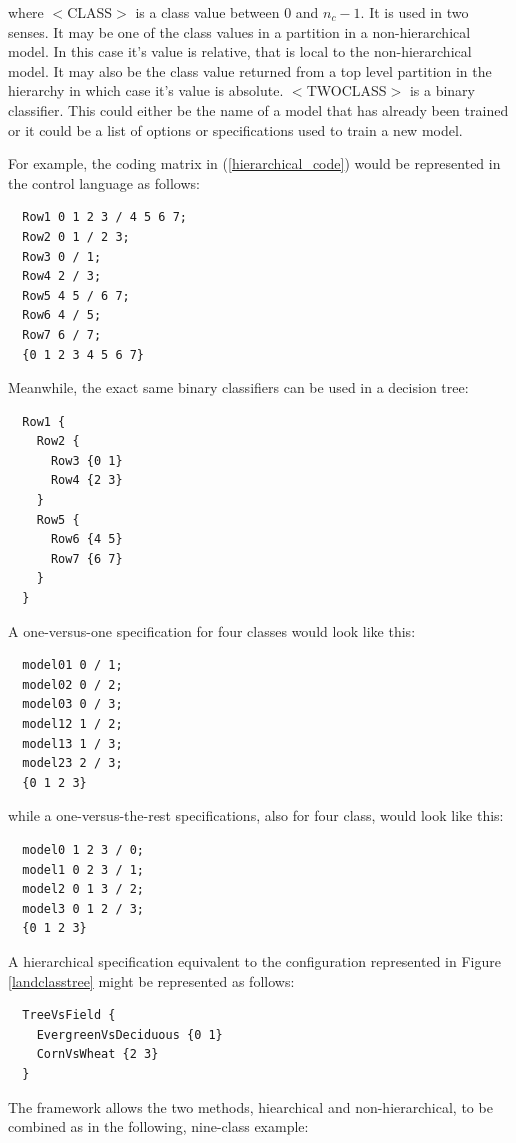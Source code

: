 where $<$CLASS$>$ is a class value between 0 and $n_c-1$.  It is used in two senses.
It may be one of the class values in a partition in a non-hierarchical model.
In this case it's value is relative, that is local to the non-hierarchical model.
It may also be the class value returned
from a top level partition in the hierarchy in which case it's value is absolute.
$<$TWOCLASS$>$ is a binary classifier.
This could either be the name of a model that has already been trained or it
could be a list of options or specifications used to train a new model.

For example, the coding matrix in (\ref{hierarchical_code})
would be represented in the control language as follows:

\begin{verbatim}
  Row1 0 1 2 3 / 4 5 6 7;
  Row2 0 1 / 2 3;
  Row3 0 / 1;
  Row4 2 / 3;
  Row5 4 5 / 6 7;
  Row6 4 / 5;
  Row7 6 / 7;
  {0 1 2 3 4 5 6 7}
\end{verbatim}

Meanwhile, the exact same binary classifiers can be used in
a decision tree: 

\begin{verbatim}
  Row1 {
    Row2 {
      Row3 {0 1}
      Row4 {2 3}
    }
    Row5 {
      Row6 {4 5}
      Row7 {6 7}
    }
  }
\end{verbatim}

A one-versus-one specification for four classes would look like
this:

\begin{verbatim}
  model01 0 / 1;
  model02 0 / 2;
  model03 0 / 3;
  model12 1 / 2;
  model13 1 / 3;
  model23 2 / 3;
  {0 1 2 3}
\end{verbatim}

while a one-versus-the-rest specifications, also for four class, would look
like this:

\begin{verbatim}
  model0 1 2 3 / 0;
  model1 0 2 3 / 1;
  model2 0 1 3 / 2;
  model3 0 1 2 / 3;
  {0 1 2 3}
\end{verbatim}

A hierarchical specification
equivalent to the configuration represented in Figure \ref{landclasstree}
might be represented as follows:

\begin{verbatim}
  TreeVsField {
    EvergreenVsDeciduous {0 1}
    CornVsWheat {2 3}
  }
\end{verbatim}

The framework allows the two methods,
 hiearchical and non-hierarchical, 
to be combined
as in the following, nine-class example:

